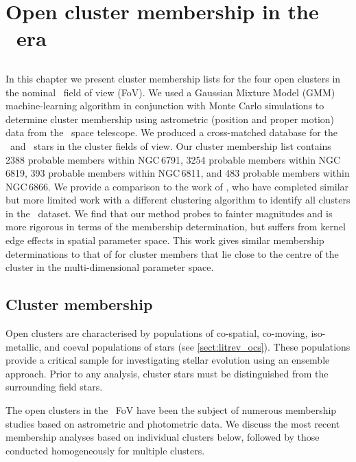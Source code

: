 \chapter[Gaia cluster membership]{Open cluster membership in the \Gaia~era}
\label{chap:membership}

\section*{}
    In this chapter we present cluster membership lists for the four open clusters in the nominal \Kepler~field of view (FoV). We used a Gaussian Mixture Model (GMM) machine-learning algorithm in conjunction with Monte Carlo simulations to determine cluster membership using astrometric (position and proper motion) data from the \Gaia~space telescope. We produced a cross-matched database for the \Gaia~and \Kepler~stars in the cluster fields of view. Our cluster membership list contains 2388 probable members within NGC\,6791, 3254 probable members within NGC\,6819, 393 probable members within NGC\,6811, and 483 probable members within NGC\,6866. We provide a comparison to the work of \cite{cantat-gaudin_gaia_2018}, who have completed similar but more limited work with a different clustering algorithm to identify all clusters in the \Gaia~dataset. We find that our method probes to fainter magnitudes and is more rigorous in terms of the membership determination, but suffers from kernel edge effects in spatial parameter space. This work gives similar membership determinations to that of \cite{cantat-gaudin_gaia_2018} for cluster members that lie close to the centre of the cluster in the multi-dimensional parameter space.
\newpage
\section{Cluster membership}

Open clusters are characterised by populations of co-spatial, co-moving, iso-metallic, and coeval populations of stars (see \cref{sect:litrev_ocs}). These populations provide a critical sample for investigating stellar evolution using an ensemble approach. Prior to any analysis, cluster stars must be distinguished from the surrounding field stars. 

The open clusters in the \Kepler~FoV have been the subject of numerous membership studies based on astrometric and photometric data. We discuss the most recent membership analyses based on individual clusters below, followed by those conducted homogeneously for multiple clusters.

